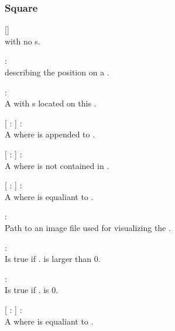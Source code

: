\subsubsection{Square}
\begin{dlist}
	\item {}[]\\
	 with no s.
	
	\item {} : \\
	 describing the position on a .
	
	\item {} : \\
	A  with s located on this .
	
	\item {}[  :  ] : \\
	A  where  is appended to .
	
	\item {}[  :  ] : \\
	A  where  is not contained in .
	
	\item {}[  :  ] : \\
	A  where  is equaliant to .
	
	\item {} : \\
	Path to an image file used for visualizing the .
	
	\item {} : \\
	Is true if . is larger than 0.
	
	\item {} : \\
	Is true if . is 0.
	
	\item {}[  :  ] : \\
	A  where  is equaliant to .
\end{dlist}

